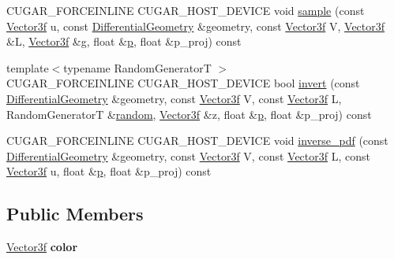 \begin{DoxyCompactItemize}
\item 
C\+U\+G\+A\+R\+\_\+\+F\+O\+R\+C\+E\+I\+N\+L\+I\+NE C\+U\+G\+A\+R\+\_\+\+H\+O\+S\+T\+\_\+\+D\+E\+V\+I\+CE void \hyperlink{structcugar_1_1_lambert_bsdf_a6378aa0c0f3667144affa8b5ee1308aa}{sample} (const \hyperlink{structcugar_1_1_vector}{Vector3f} u, const \hyperlink{structcugar_1_1_differential_geometry}{Differential\+Geometry} \&geometry, const \hyperlink{structcugar_1_1_vector}{Vector3f} V, \hyperlink{structcugar_1_1_vector}{Vector3f} \&L, \hyperlink{structcugar_1_1_vector}{Vector3f} \&g, float \&\hyperlink{structcugar_1_1_lambert_bsdf_a954a19a6d6fd8d13bc35c65135e15a0a}{p}, float \&p\+\_\+proj) const
\item 
{\footnotesize template$<$typename Random\+GeneratorT $>$ }\\C\+U\+G\+A\+R\+\_\+\+F\+O\+R\+C\+E\+I\+N\+L\+I\+NE C\+U\+G\+A\+R\+\_\+\+H\+O\+S\+T\+\_\+\+D\+E\+V\+I\+CE bool \hyperlink{structcugar_1_1_lambert_bsdf_a5bd701c8aa7b80a0fef18da32ad1d1f4}{invert} (const \hyperlink{structcugar_1_1_differential_geometry}{Differential\+Geometry} \&geometry, const \hyperlink{structcugar_1_1_vector}{Vector3f} V, const \hyperlink{structcugar_1_1_vector}{Vector3f} L, Random\+GeneratorT \&\hyperlink{group___sampling_module_gaec17bbbfd36295353081b7b4480d933d}{random}, \hyperlink{structcugar_1_1_vector}{Vector3f} \&z, float \&\hyperlink{structcugar_1_1_lambert_bsdf_a954a19a6d6fd8d13bc35c65135e15a0a}{p}, float \&p\+\_\+proj) const
\item 
C\+U\+G\+A\+R\+\_\+\+F\+O\+R\+C\+E\+I\+N\+L\+I\+NE C\+U\+G\+A\+R\+\_\+\+H\+O\+S\+T\+\_\+\+D\+E\+V\+I\+CE void \hyperlink{structcugar_1_1_lambert_bsdf_acefc82404f7abc7d41e5d5263f5c9ef3}{inverse\+\_\+pdf} (const \hyperlink{structcugar_1_1_differential_geometry}{Differential\+Geometry} \&geometry, const \hyperlink{structcugar_1_1_vector}{Vector3f} V, const \hyperlink{structcugar_1_1_vector}{Vector3f} L, const \hyperlink{structcugar_1_1_vector}{Vector3f} u, float \&\hyperlink{structcugar_1_1_lambert_bsdf_a954a19a6d6fd8d13bc35c65135e15a0a}{p}, float \&p\+\_\+proj) const
\end{DoxyCompactItemize}
\subsection*{Public Members}
\begin{DoxyCompactItemize}
\item 
\mbox{\label{structcugar_1_1_lambert_bsdf_a8da051eb6b75101743980d159f255d64}} 
\hyperlink{structcugar_1_1_vector}{Vector3f} {\bfseries color}
\end{DoxyCompactItemize}


